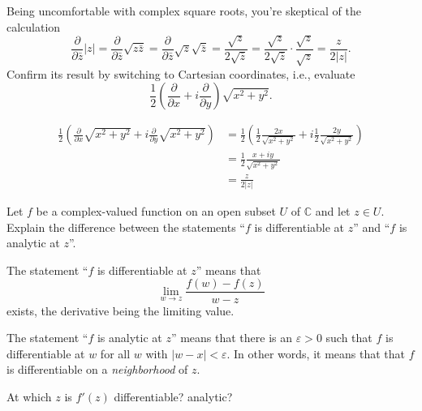 \documentclass[12pt, answers]{exam}
\newcommand{\CC}{\mathbb{C}}
\renewcommand{\epsilon}{\varepsilon}
\begin{document}
\begin{questions}
    \question
    Being uncomfortable with complex square roots, you're skeptical of the calculation
    \[
        \frac{\partial}{\partial \bar z}|z| = \frac{\partial}{\partial \bar z}\sqrt{z\bar z}
        = \frac{\partial}{\partial \bar z}\sqrt{z}\sqrt{\bar z}
        =\frac{\sqrt z}{2\sqrt{\bar z}}
        =\frac{\sqrt z}{2\sqrt{\bar z}}\cdot\frac{\sqrt z}{\sqrt{z}}
        =\frac z{2|z|}.
    \]
    Confirm its result by switching to Cartesian coordinates, i.e., evaluate
    \[
        \frac12\left(\frac{\partial}{\partial x} + i\frac{\partial}{\partial y}\right)\sqrt{x^2+y^2}.
    \]
    \begin{solution}
        \begin{align*}
            \frac12\left(\frac{\partial}{\partial x}\sqrt{x^2+y^2} + i\frac{\partial}{\partial y}\sqrt{x^2+y^2}\right)
         &= \frac12\left(\frac12\frac{2x}{\sqrt{x^2+y^2}} + i\frac12\frac{2y}{\sqrt{x^2+y^2}}\right)\\
         &= \frac12\frac{x+iy}{\sqrt{x^2+y^2}}\\
         &=\frac{z}{2|z|}
        \end{align*}
    \end{solution}
    


    \question
    Let $f$ be a complex-valued function on an open subset $U$ of $\CC$ and let $z\in U$.
    Explain the difference between the statements
    ``$f$ is differentiable at $z$'' and ``$f$ is analytic at $z$''.

    \begin{solution}
        The statement ``$f$ is differentiable at $z$'' means that
        \[
            \lim_{w\to z}\frac{f(w) - f(z)}{w-z}
        \]
        exists, the derivative being the limiting value. 

        The statement ``$f$ is analytic at $z$'' means that there is an $\epsilon>0$ such that
        $f$ is differentiable at $w$ for all $w$ with $|w-x|<\epsilon$.
        In other words, it means that that $f$ is differentiable on a \emph{neighborhood} of $z$.
    \end{solution}
    
    \question At which $z$ is $f'(z)$ differentiable? analytic?

\end{questions}
\end{document}
